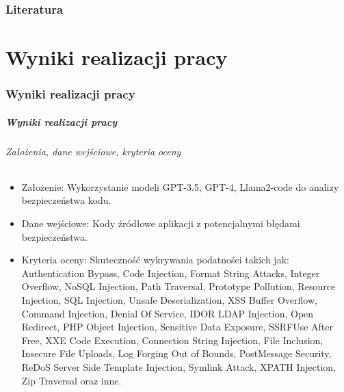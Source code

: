 \documentclass[lualatex,aspectratio=54,12pt,]{beamer}
\begin{document}
\section{Literatura}
\part{Wyniki realizacji pracy}
\section{Wyniki realizacji pracy}

\begin{frame}
      \partpage
\end{frame}

\begin{frame}
      \frametitle{Wyniki realizacji pracy}
      \framesubtitle{Założenia, dane wejściowe, kryteria oceny}
      \begin{itemize}
        \item Założenie: Wykorzystanie modeli GPT-3.5, GPT-4, Llama2-code do analizy bezpieczeństwa kodu.
        \item Dane wejściowe: Kody źródłowe aplikacji z potencjalnymi błędami bezpieczeństwa.
        \item Kryteria oceny: Skuteczność wykrywania podatności takich jak: \\ \scriptsize Authentication Bypass, Code Injection, Format String Attacks, Integer Overflow, NoSQL Injection, Path Traversal, Prototype Pollution, Resource Injection, 
        SQL Injection, Unsafe Deserialization, XSS Buffer Overflow, Command Injection, Denial Of Service, IDOR LDAP Injection, Open Redirect, PHP Object Injection, Sensitive Data Exposure, SSRFUse After Free, XXE Code Execution, Connection String Injection, 
        File Inclusion, Insecure File Uploads, Log Forging Out of Bounds, PostMessage Security, ReDoS Server Side Template Injection, Symlink Attack, XPATH Injection, Zip Traversal oraz inne.
      \end{itemize}
\end{frame}
\end{document}
